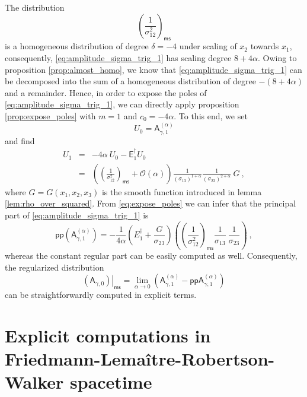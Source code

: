 \documentclass[11pt]{book}
\newcommand{\pp}{\mathsf{pp}}
\newcommand{\ms}{\mathsf{ms}}
\newcommand{\Ocal}{\mathcal{O}}
\newcommand{\Asf}{\mathsf{A}}
\newcommand{\Esf}{\mathsf{E}}
\theoremstyle{break}
\begin{document}
%
The distribution 
%
\begin{equation*}
\left(\frac{1}{\sigma^2_{12}}\right)_\ms 
\end{equation*}
%
is a homogeneous distribution of degree $\delta=-4$ under scaling of $x_2$ towards $x_1$, consequently, \eqref{eq:amplitude_sigma_trig_1} has scaling degree $8+4\alpha$. Owing to proposition \ref{prop:almost_homo}, we know that \eqref{eq:amplitude_sigma_trig_1} can be decomposed into the sum of a homogeneous distribution of degree $-(8+4\alpha)$ and a remainder. Hence, in order to expose the poles of \eqref{eq:amplitude_sigma_trig_1}, we can directly apply proposition \ref{prop:expose_poles} with $m=1$ and $c_0 = -4\alpha$. To this end, we set 
%
\begin{equation*}
U_0 = \Asf_{\gamma,1}^{(\alpha)}
\end{equation*}
%
and find 
%
\begin{eqnarray*}
U_1 &=& -4 \alpha \ U_0 - \Esf^\dagger_1 U_0 \\
&=& \left(\left(\frac{1}{\sigma_{12}^{2}} \right)_\ms + \Ocal(\alpha) \right) \frac{1}{(\sigma_{13})^{1+\alpha}} \frac{1}{(\sigma_{23})^{2+\alpha}} \ G \ ,
\end{eqnarray*}
%
where $G=G(x_1,x_2,x_3)$ is the smooth function introduced in lemma \ref{lem:rho_over_squared}. From \eqref{eq:expose_poles} we can infer that the principal part of \eqref{eq:amplitude_sigma_trig_1} is
%
\begin{equation*}
\pp\left(\Asf_{\gamma,1}^{(\alpha)}\right) = - \frac{1}{4\alpha} \left(E^\dagger_1 + \frac{G}{\sigma_{23}}\right) \left( \left(\frac{1}{\sigma_{12}^2}\right)_\ms \frac{1}{\sigma_{13}} \ \frac{1}{\sigma_{23}} \right) \ ,
\end{equation*}
%
whereas the constant regular part can be easily computed as well. Consequently, the regularized distribution
%
\begin{equation*}
\left.(\Asf_{\gamma,0})\right|_\ms = \lim_{\alpha\to 0} \left( \Asf_{\gamma,1}^{(\alpha)} - \pp \Asf_{\gamma,1}^{(\alpha)} \right)
\end{equation*}
%
can be straightforwardly computed in explicit terms.


\section{Explicit computations in Friedmann-Lemaître-Robertson-Walker spacetime}
\end{document}
